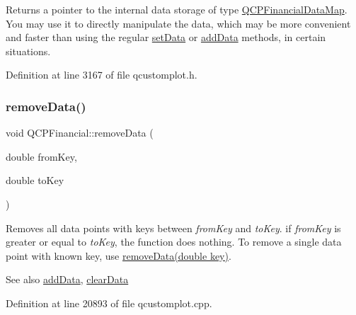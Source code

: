 Returns a pointer to the internal data storage of type \hyperlink{qcustomplot_8h_a745c09823fae0974b50beca9bc3b3d7d}{Q\+C\+P\+Financial\+Data\+Map}. You may use it to directly manipulate the data, which may be more convenient and faster than using the regular \hyperlink{class_q_c_p_financial_adf12a86082f1e488df6a4e8603f8fd6d}{set\+Data} or \hyperlink{class_q_c_p_financial_a1a83396f97fcc68f2b7aa8d9782feffe}{add\+Data} methods, in certain situations. 

Definition at line 3167 of file qcustomplot.\+h.

\mbox{\label{class_q_c_p_financial_a048c741d3c8cc5709c2c44b759fdf27c}} 
\subsubsection{\texorpdfstring{remove\+Data()}{removeData()}\hspace{0.1cm}{\footnotesize\ttfamily [1/2]}}
{\footnotesize\ttfamily void Q\+C\+P\+Financial\+::remove\+Data (\begin{DoxyParamCaption}\item[{double}]{from\+Key,  }\item[{double}]{to\+Key }\end{DoxyParamCaption})}

Removes all data points with keys between {\itshape from\+Key} and {\itshape to\+Key}. if {\itshape from\+Key} is greater or equal to {\itshape to\+Key}, the function does nothing. To remove a single data point with known key, use \hyperlink{class_q_c_p_financial_ae527d8a11290906b083d1ab598c380ea}{remove\+Data(double key)}.

\begin{DoxySeeAlso}{See also}
\hyperlink{class_q_c_p_financial_a1a83396f97fcc68f2b7aa8d9782feffe}{add\+Data}, \hyperlink{class_q_c_p_financial_a11fd49928c33e55e27b7319c6927864a}{clear\+Data} 
\end{DoxySeeAlso}


Definition at line 20893 of file qcustomplot.\+cpp.

\mbox{\label{class_q_c_p_financial_ae527d8a11290906b083d1ab598c380ea}} 
